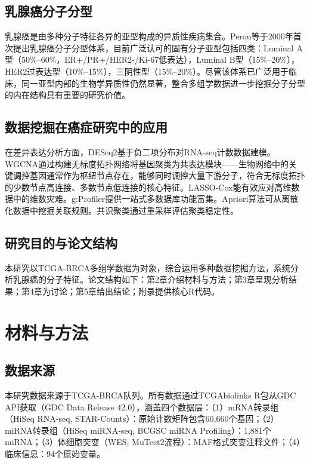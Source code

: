 \documentclass[12pt,a4paper,openany]{ctexbook}
\begin{document}
\section{乳腺癌分子分型}
乳腺癌是由多种分子特征各异的亚型构成的异质性疾病集合。Perou等\cite{perou2000molecular}于2000年首次提出乳腺癌分子分型体系，目前广泛认可的固有分子亚型包括四类：Luminal A型（50\%--60\%，ER+/PR+/HER2-/Ki-67低表达），Luminal B型（15\%--20\%），HER2过表达型（10\%--15\%），三阴性型（15\%--20\%）。尽管该体系已广泛用于临床，同一亚型内部的生物学异质性仍然显著，整合多组学数据进一步挖掘分子分型的内在结构具有重要的研究价值。

\section{数据挖掘在癌症研究中的应用}
在差异表达分析方面，DESeq2\cite{love2014moderated}基于负二项分布对RNA-seq计数数据建模。WGCNA\cite{langfelder2008wgcna}通过构建无标度拓扑网络将基因聚类为共表达模块——生物网络中的关键调控基因通常作为枢纽节点存在，能够同时调控大量下游分子，符合无标度拓扑的少数节点高连接、多数节点低连接的核心特征。LASSO-Cox\cite{simon2011regularization}能有效应对高维数据中的维数灾难。g:Profiler\cite{kolberg2023gprofiler}提供一站式多数据库功能富集。Apriori算法\cite{agrawal1994fast}可从离散化数据中挖掘关联规则。共识聚类\cite{wilkerson2010consensus}通过重采样评估聚类稳定性。

\section{研究目的与论文结构}
本研究以TCGA-BRCA多组学数据为对象，综合运用多种数据挖掘方法，系统分析乳腺癌的分子特征。论文结构如下：第2章介绍材料与方法；第3章呈现分析结果；第4章为讨论；第5章给出结论；附录提供核心R代码。

\chapter{材料与方法}

\section{数据来源}
本研究数据来源于TCGA-BRCA队列。所有数据通过TCGAbiolinks R包\cite{colaprico2016tcgabiolinks}从GDC API获取（GDC Data Release 42.0），涵盖四个数据层：（1）mRNA转录组（HiSeq RNA-seq, STAR-Counts）：原始计数矩阵包含60,660个基因；（2）miRNA转录组（HiSeq miRNA-seq, BCGSC miRNA Profiling）：1,881个miRNA；（3）体细胞突变（WES, MuTect2流程）：MAF格式突变注释文件；（4）临床信息：94个原始变量。
\end{document}
